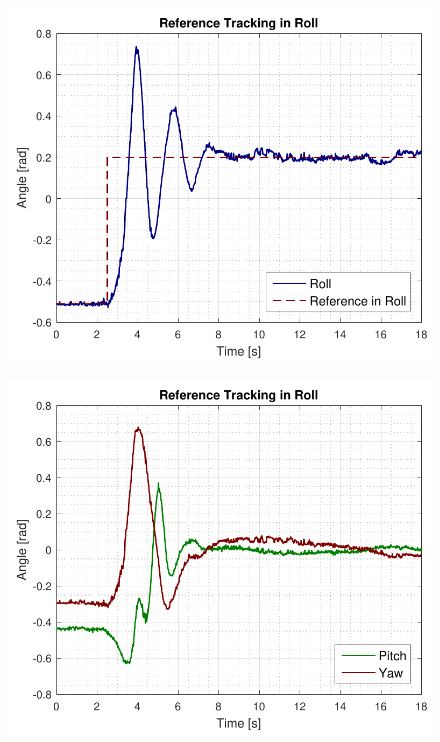 \begin{minipage}{\linewidth}
    \begin{minipage}{0.46\linewidth}
        \begin{figure}[H]
            \includegraphics[scale=.5]{figures/rollRefAccept.pdf}
            \centering			
            \label{fig:rollRefAccept}
        \end{figure}
    \end{minipage}
    \hspace{0.03\linewidth}
    \begin{minipage}{0.46\linewidth}
        \begin{figure}[H]
            \includegraphics[scale=.5]{figures/rollRefAcceptPitchYaw.pdf}
            \centering
            \label{fig:rollRefAcceptPitchYaw}
        \end{figure}
    \end{minipage}
\end{minipage}

